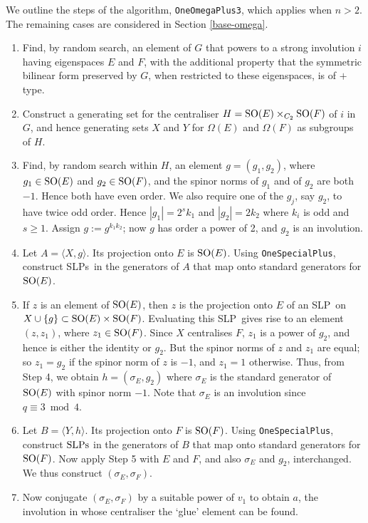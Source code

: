 \documentclass[12pt]{article}
\def\SO{{\rm SO}}
\def\SLP{{\rm SLP}}
\def\SLPs{{\rm SLPs}}
\begin{document}
We outline the steps of the algorithm, {\tt OneOmegaPlus3},
which applies when $n > 2$. The remaining cases
are considered in Section \ref{base-omega}.
\begin{enumerate}
\item  
Find, by random search, an element of $G$ that powers to 
a strong involution $i$ having eigenspaces $E$ and $F$,
with the additional property that the symmetric bilinear form 
preserved by $G$, 
when restricted to these eigenspaces, is of $+$ type.  

\item 
Construct a generating set for the centraliser
$H=\SO(E)\times_{C_2}\SO(F)$ of $i$ in $G$, 
and hence generating sets $X$ and $Y$ for $\Omega(E)$ and $\Omega(F)$ as
subgroups of $H$.  

\item 
Find, by random search within $H$, an element $g=(g_1,g_2)$, where
$g_1\in\SO(E)$ and $g_2\in\SO(F)$, and the spinor norms of 
$g_1$ and of $g_2$ are both $-1$. Hence both have even order.
We also require one of the $g_j$, say $g_2$, to have twice odd order.  
Hence $|g_1| = 2^s k_1$ and $|g_2| = 2 k_2$ where $k_i$ is odd and $s \geq 1$. 
Assign $g := g^{k_1 k_2}$; now $g$ has order a 
power of 2, and $g_2$ is an involution.  

\item Let $A = \langle X, g \rangle$.
Its projection onto $E$ is $\SO(E)$.
Using {\tt OneSpecialPlus},
construct \SLPs\ in the generators of $A$ that map onto
standard generators for $\SO(E)$.

\item 
If $z$ is an element of $\SO(E)$, then $z$ is the projection onto $E$ of
an \SLP\ on $X\cup\{g\}\subset\SO(E)\times\SO(F)$.  Evaluating this
\SLP\ gives rise to an element $(z,z_1)$, where $z_1\in\SO(F)$.  
Since $X$ centralises $F$, $z_1$ is a power of $g_2$, and hence is 
either the identity
or $g_2$. But the spinor norms of $z$ and $z_1$ are equal; so $z_1=g_2$ if
the spinor norm of $z$ is $-1$, and $z_1=1$ otherwise.  Thus, from
Step 4, we obtain $h=(\sigma_E,g_2)$ where $\sigma_E$ is the standard
generator of $\SO(E)$ with spinor norm $-1$.  Note that $\sigma_E$ is an
involution since $q\equiv3\bmod4$.

\item  Let $B=\langle Y,h \rangle$.  Its projection onto $F$ is $\SO(F)$.
Using {\tt OneSpecialPlus}, construct $\SLPs$ in the generators of $B$ 
that map onto standard generators for $\SO(F)$.  Now apply Step 5 with 
$E$ and $F$, and also $\sigma_E$ and $g_2$, interchanged.  
We thus construct $(\sigma_E,\sigma_F)$.

\item  Now conjugate $(\sigma_E, \sigma_F)$ by a suitable
power of $v_1$ to obtain $a$, the involution
in whose centraliser the `glue' element can be found.
\end{enumerate}
\end{document}
